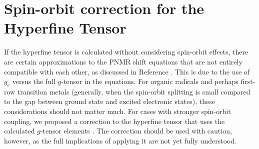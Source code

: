 \documentclass[11pt]{report}
\renewcommand{\vec}{\bm}
\newcommand{\mat}{\bm}    %
\newcommand{\ten}{\bm}
\newcommand\sd{\mathrm{sd}}
\begin{document}
\section{Spin-orbit correction for the Hyperfine Tensor}
\label{sec:hypcorrect}

If the hyperfine tensor is calculated without considering spin-orbit
effects, there are certain approximations to the PNMR shift equations
that are not entirely compatible with each other, as discussed in
Reference . This is due to the use of $g_e$
versus the full $g$-tensor in the equations. For organic radicals and
perhaps first-row transition metals (generally, when the spin-orbit
splitting is small compared to the gap between ground state and
excited electronic states), these considerations should not matter
much. For cases with stronger spin-orbit coupling, we proposed a
correction to the hyperfine tensor that uses the calculated $g$-tensor
elements \cite{Autschbach:2011c}. The correction should be used with
caution, however, as the full implications of applying it are not yet
fully understood. 


\end{document}
